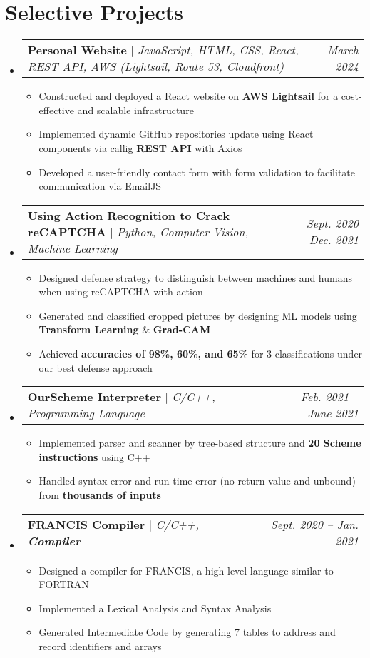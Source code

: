 \documentclass[letterpaper,11pt]{article}
\makeatletter
\newcommand{\HL}[1]{
  \textbf{\textcolor{DukeBlue}{#1}}
}
\newcommand{\subheadingtitlevspace}{
\vspace{-3pt}
}
\newcommand{\resumeItem}[1]{
  \item{
    {#1}\vspace{-4pt}
  }
}
\newcommand{\titleItem}[1]{
  \textbf{#1}
}
\newcommand{\resumeProjectHeading}[2]{
    \item
    \begin{tabular*}{0.97\textwidth}{l@{\extracolsep{\fill}}r}
      #1 & \textit{ #2}
    \end{tabular*}\vspace{-8pt}
}
\newcommand{\resumeSubHeadingListStart}{\subheadingtitlevspace\begin{itemize}[leftmargin=0in, label={}]}
\newcommand{\resumeSubHeadingListEnd}{\end{itemize}}
\newcommand{\resumeItemListStart}{
\begin{itemize}[label={$\bullet$}, labelsep=8pt, itemsep=4pt]}
\newcommand{\resumeItemListEnd}{
\end{itemize}\vspace{-8pt}}
\makeatother
\begin{document}
 \section{Selective Projects}    
  \resumeSubHeadingListStart
    \resumeProjectHeading
      {\titleItem{Personal Website} $|$ \emph{JavaScript, HTML, CSS, React, REST API, AWS (Lightsail, Route 53, Cloudfront)}}{March 2024}
      \resumeItemListStart
        \resumeItem{Constructed and deployed a React website on \HL{AWS Lightsail} for a cost-effective and scalable infrastructure}
        \resumeItem{Implemented dynamic GitHub repositories update using React components via callig \HL{REST API} with Axios}
        \resumeItem{Developed a user-friendly contact form with form validation to facilitate communication via EmailJS}
      \resumeItemListEnd
    \resumeProjectHeading
      {\titleItem{Using Action Recognition to Crack reCAPTCHA} $|$ \emph{Python, Computer Vision, Machine Learning}}{Sept. 2020 -- Dec. 2021}
      \resumeItemListStart
        \resumeItem{Designed defense strategy to distinguish between machines and humans when using reCAPTCHA with action}
        \resumeItem{Generated and classified cropped pictures by designing ML models using \HL{Transform Learning}\&\HL{Grad-CAM}}
        \resumeItem{Achieved \HL{accuracies of 98\%, 60\%, and 65\%} for 3 classifications under our best defense approach}
      \resumeItemListEnd
    \resumeProjectHeading
      {\titleItem{OurScheme Interpreter} $|$ \emph{C/C++, Programming Language}}{Feb. 2021 -- June 2021}
      \resumeItemListStart
        \resumeItem{Implemented parser and scanner by tree-based structure and \HL{20 Scheme instructions} using C++} 
        \resumeItem{Handled syntax error and run-time error (no return value and unbound) from \HL{thousands of inputs}}
      \resumeItemListEnd
    \resumeProjectHeading
      {\titleItem{FRANCIS Compiler} $|$ \emph{C/C++, \HL{Compiler}}}{Sept. 2020 -- Jan. 2021}
      \resumeItemListStart
        \resumeItem{Designed a compiler for FRANCIS, a high-level language similar to FORTRAN}
        \resumeItem{Implemented a Lexical Analysis and Syntax Analysis}
        \resumeItem{Generated Intermediate Code by generating 7 tables to address and record identifiers and arrays}
      \resumeItemListEnd
  \resumeSubHeadingListEnd


\end{document}
